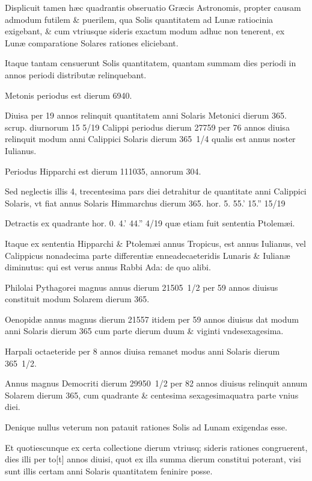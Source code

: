 \begin{parnumbers}

Displicuit tamen hæc quadrantis
obseruatio Græcis Astronomis, propter causam admodum futilem
\& puerilem, qua Solis quantitatem ad Lunæ ratiocinia exigebant,
\& cum vtriusque sideris exactum modum adhuc non tenerent,
ex Lunæ comparatione Solares rationes eliciebant.

Itaque tantam
censuerunt Solis quantitatem, quantam summam dies periodi in annos
periodi distributæ relinquebant.

Metonis periodus est dierum
6940.

Diuisa per 19 annos relinquit quantitatem anni Solaris Metonici
dierum 365. scrup. diurnorum 15 5/19 Calippi periodus dierum
27759 per 76 annos diuisa relinquit modum anni Calippici Solaris
dierum 365 1/4 qualis est annus noster Iulianus.

Periodus Hipparchi
est dierum 111035, annorum 304.

Sed neglectis illis 4,
trecentesima pars diei detrahitur de quantitate anni Calippici Solaris,
vt fiat annus Solaris Himmarchus
 dierum 365. hor. 5. 55.' 15.'' 15/19

Detractis ex quadrante hor. 0. 4.' 44.'' 4/19 quæ etiam fuit sententia
Ptolemæi.

Itaque ex sententia Hipparchi \& Ptolemæi annus
Tropicus, est annus Iulianus, vel Calippicus nonadecima parte
differentiæ enneadecaeteridis Lunaris \& Iulianæ diminutus: qui
est verus annus Rabbi Ada: de quo alibi.

Philolai Pythagorei magnus
annus dierum 21505 1/2 per 59 annos diuisus constituit modum
Solarem dierum 365.

Oenopidæ annus magnus dierum 21557
itidem per 59 annos diuisus dat modum anni Solaris dierum 365 cum
parte dierum duum \& viginti vndesexagesima.

Harpali octaeteride per
8 annos diuisa remanet modus anni Solaris dierum 365 1/2.

Annus magnus
Democriti dierum 29950 1/2 per 82 annos diuisus relinquit annum
Solarem dierum 365, cum quadrante \& centesima sexagesimaquatra
parte vnius diei.

Denique nullus veterum non patauit rationes
Solis ad Lunam exigendas esse.

Et quotiescunque ex certa collectione
dierum vtriusq; sideris rationes congruerent, dies illi per to[t]
annos diuisi, quot ex illa summa dierum constitui poterant, visi sunt
illis certam anni Solaris quantitatem feninire posse.


\end{parnumbers}
